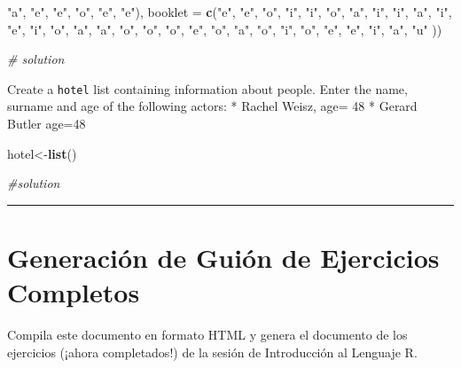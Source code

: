 \documentclass[
]{article}
\newenvironment{Shaded}{\begin{snugshade}}{\end{snugshade}}
\newcommand{\CommentTok}[1]{\textcolor[rgb]{0.56,0.35,0.01}{\textit{#1}}}
\newcommand{\DataTypeTok}[1]{\textcolor[rgb]{0.13,0.29,0.53}{#1}}
\newcommand{\KeywordTok}[1]{\textcolor[rgb]{0.13,0.29,0.53}{\textbf{#1}}}
\newcommand{\NormalTok}[1]{#1}
\newcommand{\StringTok}[1]{\textcolor[rgb]{0.31,0.60,0.02}{#1}}
\begin{document}
\begin{Shaded}
\begin{Highlighting}[]
\StringTok{"a"}\NormalTok{, }\StringTok{"e"}\NormalTok{, }\StringTok{"e"}\NormalTok{, }\StringTok{"o"}\NormalTok{, }\StringTok{"e"}\NormalTok{, }\StringTok{"e"}\NormalTok{), }\DataTypeTok{booklet =} \KeywordTok{c}\NormalTok{(}\StringTok{"e"}\NormalTok{, }\StringTok{"e"}\NormalTok{, }\StringTok{"o"}\NormalTok{, }\StringTok{"i"}\NormalTok{, }
\StringTok{"i"}\NormalTok{, }\StringTok{"o"}\NormalTok{, }\StringTok{"a"}\NormalTok{, }\StringTok{"i"}\NormalTok{, }\StringTok{"i"}\NormalTok{, }\StringTok{"a"}\NormalTok{, }\StringTok{"i"}\NormalTok{, }\StringTok{"e"}\NormalTok{, }\StringTok{"i"}\NormalTok{, }\StringTok{"o"}\NormalTok{, }\StringTok{"a"}\NormalTok{, }\StringTok{"a"}\NormalTok{, }\StringTok{"o"}\NormalTok{, }
\StringTok{"o"}\NormalTok{, }\StringTok{"o"}\NormalTok{, }\StringTok{"e"}\NormalTok{, }\StringTok{"o"}\NormalTok{, }\StringTok{"a"}\NormalTok{, }\StringTok{"o"}\NormalTok{, }\StringTok{"i"}\NormalTok{, }\StringTok{"o"}\NormalTok{, }\StringTok{"e"}\NormalTok{, }\StringTok{"e"}\NormalTok{, }\StringTok{"i"}\NormalTok{, }\StringTok{"a"}\NormalTok{, }\StringTok{"u"}
\NormalTok{))}

\CommentTok{# solution}
\end{Highlighting}
\end{Shaded}

Create a \texttt{hotel} list containing information about people. Enter
the name, surname and age of the following actors: * Rachel Weisz, age=
48 * Gerard Butler age=48

\begin{Shaded}
\begin{Highlighting}[]
\NormalTok{hotel<-}\KeywordTok{list}\NormalTok{()}

\CommentTok{#solution}
\end{Highlighting}
\end{Shaded}

\begin{center}\rule{0.5\linewidth}{0.5pt}\end{center}

\hypertarget{generaciuxf3n-de-guiuxf3n-de-ejercicios-completos}{%
\section{Generación de Guión de Ejercicios
Completos}\label{generaciuxf3n-de-guiuxf3n-de-ejercicios-completos}}

Compila este documento en formato HTML y genera el documento de los
ejercicios (¡ahora completados!) de la sesión de Introducción al
Lenguaje R.
\end{document}
